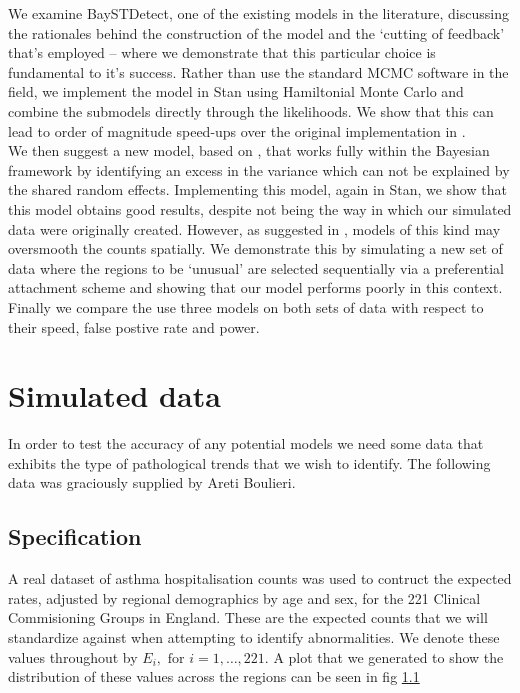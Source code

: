 \documentclass[11pt]{report}
\begin{document}
We examine BaySTDetect, one of the existing models in the literature, discussing the rationales behind the construction of the model and the `cutting of feedback' that's employed -- where we demonstrate that this particular choice is fundamental to it's success. Rather than use the standard MCMC software in the field, we implement the model in Stan using Hamiltonial Monte Carlo and combine the submodels directly through the likelihoods. We show that this can lead to order of magnitude speed-ups over the original implementation in \citet{baystdetect}. \\

We then suggest a new model, based on \citet{stability}, that works fully within the Bayesian framework by identifying an excess in the variance which can not be explained by the shared random effects. Implementing this model, again in Stan, we show that this model obtains good results, despite not being the way in which our simulated data were originally created. However, as suggested in \citet{best2005comparison}, models of this kind may oversmooth the counts spatially. We demonstrate this by simulating a new set of data where the regions to be `unusual' are selected sequentially via a preferential attachment scheme and showing that our model performs poorly in this context. \\

Finally we compare the use three models on both sets of data with respect to their speed, false postive rate and power.

\chapter{Simulated data}

In order to test the accuracy of any potential models we need some data that exhibits the type of pathological trends that we wish to identify. The following data was graciously supplied by Areti Boulieri.

\section{Specification}

A real dataset of asthma hospitalisation counts was used to contruct the expected rates, adjusted by regional demographics by age and sex, for the 221 Clinical Commisioning Groups in England. These are the expected counts that we will standardize against when attempting to identify abnormalities. We denote these values throughout by $E_{i}, \text{ for } i=1,\ldots,221$. A plot that we generated to show the distribution of these values across the regions can be seen in fig \ref{}  \\
\end{document}
